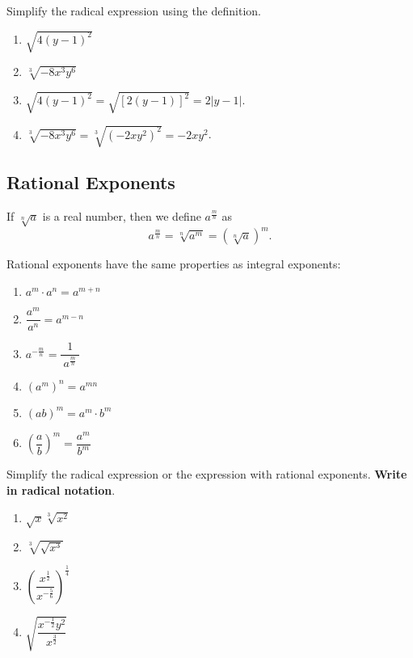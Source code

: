 \begin{example}
  Simplify the radical expression using the definition.
  
  \begin{enumerate}
  \item
    \(\sqrt{4(y-1)^2}\)
  \item
    \(\sqrt[3]{-8x^3y^6}\)
  \item
    \(\sqrt{4(y-1)^2}=\sqrt{[2(y-1)]^2}=2|y-1|\).
  \item
    \(\sqrt[3]{-8x^3y^6}=\sqrt[3]{(-2xy^2)^2}=-2xy^2\).
  \end{enumerate}
\end{example}

\hypertarget{rational-exponents}{%
\subsection{Rational Exponents}\label{rational-exponents}}

If \(\sqrt[n]{a}\) is a real number, then we define \(a^{\frac mn}\) as
\[
a^{\frac mn}=\sqrt[n]{a^m}=(\sqrt[n]{a})^m.
\]

Rational exponents have the same properties as integral exponents:

\begin{enumerate}[sepno]
\item
  \(a^m\cdot a^n=a^{m+n}\)
\item
    \(\dfrac{a^m}{a^n}=a^{m-n}\)
\item
  \(a^{-\frac mn}=\dfrac{~1~}{~a^{\frac mn}~}\)\\
\item
  \((a^m)^n=a^{mn}\)
\item
  \((ab)^m=a^m\cdot b^m\)
\item
  \(\left(\dfrac ab\right)^m=\dfrac{a^m}{b^m}\)
\end{enumerate}

\begin{example}
  Simplify the radical expression or the expression with rational
  exponents. \textbf{Write in radical notation}.
  
  \begin{enumerate}
  \item
    \(\sqrt{x}\sqrt[3]{x^2}\)
  \item
    \(\sqrt[3]{\sqrt{x^3}}\)
  \item
    \(\left(\dfrac{x^{\frac12}}{x^{-\frac56}}\right )^{\frac14}\)
  \item
    \(\sqrt{\dfrac{x^{-\frac12}y^2}{x^{\frac32}}}\)
  \end{enumerate}
\end{example}


